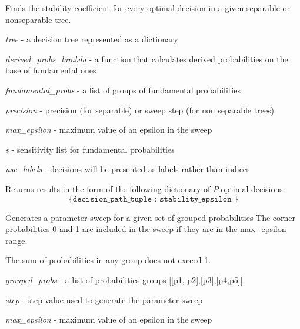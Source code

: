 \documentclass[a4paper,10pt,english]{sphinxmanual}
\begin{document}

\begin{fulllineitems}
	\label{index:chondro.find_stability}
	Finds the stability coefficient for every optimal decision
	in a given separable or nonseparable tree.
	
	\emph{tree} - a decision tree represented as a dictionary
	
	\emph{derived\_probs\_lambda} - a function that calculates derived probabilities     on the  base of fundamental ones
	
	\emph{fundamental\_probs} - a list of groups of fundamental probabilities
	
	\emph{precision} - precision (for separable) or sweep step     (for non separable trees)
	
	\emph{max\_epsilon} - maximum value of an epsilon in the sweep
	
	\emph{s} - sensitivity list for fundamental probabilities
	
	\emph{use\_labels} - decisions will be presented as labels rather than indices
		
	Returns results in the form of the following dictionary of $P$-optimal decisions:		
	\begin{equation*}
		\texttt{\{ decision\_path\_tuple : stability\_epsilon \} }
		\end{equation*}
	
\end{fulllineitems}


\begin{fulllineitems}
	\label{index:chondro.full_sweep}
	Generates a parameter sweep for a given set of grouped probabilities
	The corner probabilities 0 and 1 are included in the sweep if they are 
	in the max\_epsilon range.
	
	The sum of probabilities in any group does not exceed 1.
	
	\emph{grouped\_probs} - a list of probabilities groups {[}{[}p1, p2{]},{[}p3{]},{[}p4,p5{]}{]}
	
	\emph{step} - step value used to generate the parameter sweep
	
	\emph{max\_epsilon} - maximum value of an epsilon in the sweep
	
\end{fulllineitems}
\end{document}
